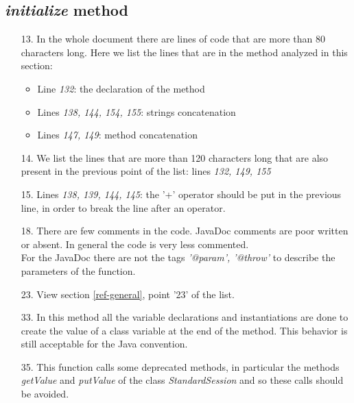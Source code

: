 \subsection{\textit{initialize} method}

\begin{itemize}
        \item[13.] In the whole document there are lines of code that are more than 80 characters long. 
        \newline
        Here we list the lines that are in the method analyzed in this section:
            \begin{itemize}
                \item Line \textit{132}: the declaration of the method
                \item Lines \textit{138, 144, 154, 155}: strings concatenation
                \item Lines \textit{147, 149}: method concatenation
            \end{itemize}
    \item[14.] 
    We list the lines that are more than 120 characters long that are also present in the previous point of the list: lines \textit{132, 149, 155}
    \item[15.] Lines \textit{138, 139, 144, 145}: the '+' operator should be put in the previous line, in order to break the line after an operator.
    \item[18.] There are few comments in the code. JavaDoc comments are poor written or absent. In general the code is very less commented.\\
    For the JavaDoc there are not the tags \textit{'@param', '@throw'} to describe the parameters of the function.
    \item[23.] View section \ref{ref-general}, point '23' of the list.
    \item[33.] In this method all the variable declarations and instantiations are done to create the value of a class variable at the end of the method. This behavior is still acceptable for the Java convention.
    \item[35.] This function calls some deprecated methods, in particular the methods \textit{getValue} and \textit{putValue} of the class \textit{StandardSession} and so these calls should be avoided.
\end{itemize}